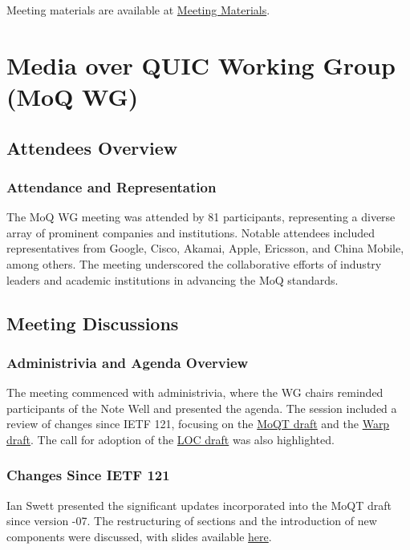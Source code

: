 \documentclass{article}
\begin{document}
Meeting materials are available at \href{https://example.com/meeting-materials}{Meeting Materials}.



\newpage

\section{Media over QUIC Working Group (MoQ WG)}

\subsection{Attendees Overview}
\subsubsection{Attendance and Representation}
The MoQ WG meeting was attended by 81 participants, representing a diverse array of prominent companies and institutions. Notable attendees included representatives from Google, Cisco, Akamai, Apple, Ericsson, and China Mobile, among others. The meeting underscored the collaborative efforts of industry leaders and academic institutions in advancing the MoQ standards.

\subsection{Meeting Discussions}
\subsubsection{Administrivia and Agenda Overview}
The meeting commenced with administrivia, where the WG chairs reminded participants of the Note Well and presented the agenda. The session included a review of changes since IETF 121, focusing on the \href{https://datatracker.ietf.org/doc/html/draft-ietf-moq-transport}{MoQT draft} and the \href{https://datatracker.ietf.org/doc/html/draft-ietf-moq-warp}{Warp draft}. The call for adoption of the \href{https://datatracker.ietf.org/doc/html/draft-mzanaty-moq-loc}{LOC draft} was also highlighted.

\subsubsection{Changes Since IETF 121}
Ian Swett presented the significant updates incorporated into the MoQT draft since version -07. The restructuring of sections and the introduction of new components were discussed, with slides available \href{https://datatracker.ietf.org/meeting/122/materials/slides-122-moq-moqt-changes-since-ietf121-00}{here}.
\end{document}
